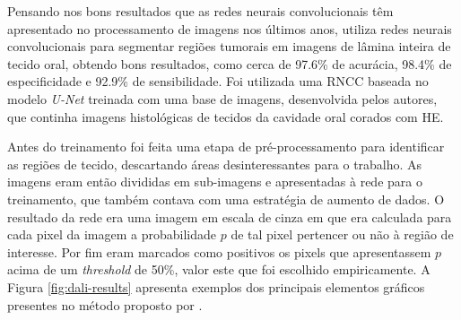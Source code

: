 Pensando nos bons resultados que as redes neurais convolucionais têm apresentado no processamento de imagens nos últimos anos, \cite{Santos2021} utiliza redes neurais convolucionais para segmentar regiões tumorais em imagens de lâmina inteira de tecido oral, obtendo bons resultados, como cerca de 97.6\% de acurácia, 98.4\% de especificidade e 92.9\% de sensibilidade. Foi utilizada uma \ac{RNCC} baseada no modelo \textit{U-Net} treinada com uma base de imagens, desenvolvida pelos autores, que continha imagens histológicas de tecidos da cavidade oral corados com \ac{HE}.

Antes do treinamento foi feita uma etapa de pré-processamento para identificar as regiões de tecido, descartando áreas desinteressantes para o trabalho.
As imagens eram então divididas em sub-imagens e apresentadas à rede para o treinamento, que também contava com uma estratégia de aumento de dados. 
O resultado da rede era uma imagem em escala de cinza em que era calculada para cada pixel da imagem a probabilidade $p$ de tal pixel pertencer ou não à região de interesse. Por fim eram marcados como positivos os pixels que apresentassem $p$ acima de um \textit{threshold} de 50\%, valor este que foi escolhido empiricamente. A Figura \ref{fig:dali-results} apresenta exemplos dos principais elementos gráficos presentes no método proposto por \cite{santos2022automated}.

